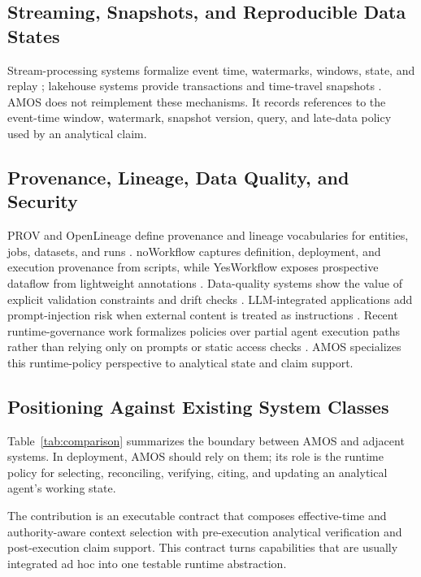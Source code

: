 \documentclass[sigconf,nonacm]{acmart}
\newcommand{\amos}{\textsc{AMOS}\xspace}
\begin{document}
\subsection{Streaming, Snapshots, and Reproducible Data States}
Stream-processing systems formalize event time, watermarks, windows, state, and replay \cite{millwheel,dataflow,flink}; lakehouse systems provide transactions and time-travel snapshots \cite{deltalake}. \amos does not reimplement these mechanisms. It records references to the event-time window, watermark, snapshot version, query, and late-data policy used by an analytical claim.

\subsection{Provenance, Lineage, Data Quality, and Security}
PROV and OpenLineage define provenance and lineage vocabularies for entities, jobs, datasets, and runs \cite{provdm,openlineage}. noWorkflow captures definition, deployment, and execution provenance from scripts, while YesWorkflow exposes prospective dataflow from lightweight annotations \cite{noworkflow,yesworkflow}. Data-quality systems show the value of explicit validation constraints and drift checks \cite{deequ,tfdv}. LLM-integrated applications add prompt-injection risk when external content is treated as instructions \cite{owasp,greshake2023indirect,yi2023bipia}. Recent runtime-governance work formalizes policies over partial agent execution paths rather than relying only on prompts or static access checks \cite{runtimegovernance}. \amos specializes this runtime-policy perspective to analytical state and claim support.

\subsection{Positioning Against Existing System Classes}
Table~\ref{tab:comparison} summarizes the boundary between \amos and adjacent systems. In deployment, \amos should rely on them; its role is the runtime policy for selecting, reconciling, verifying, citing, and updating an analytical agent's working state.

The contribution is an executable contract that composes effective-time and authority-aware context selection with pre-execution analytical verification and post-execution claim support. This contract turns capabilities that are usually integrated ad hoc into one testable runtime abstraction.
\end{document}
